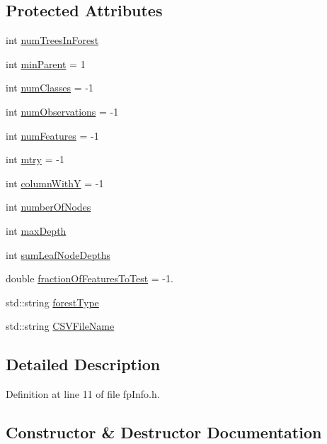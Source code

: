 \subsection*{Protected Attributes}
\begin{DoxyCompactItemize}
\item 
int \hyperlink{classfp_1_1fpInfo_a8dbd62dca5c972c29d29a69d90ca2632}{num\+Trees\+In\+Forest}
\item 
int \hyperlink{classfp_1_1fpInfo_a128fab7ba6da0fc76da00b48bb1bd7d5}{min\+Parent} = 1
\item 
int \hyperlink{classfp_1_1fpInfo_a1c98a9ced12230f21003f78d742625a3}{num\+Classes} = -\/1
\item 
int \hyperlink{classfp_1_1fpInfo_a1b35cd17d4ddb35e232246a6549d7a74}{num\+Observations} = -\/1
\item 
int \hyperlink{classfp_1_1fpInfo_a6ed8deabebae772fc213730cd29a2e61}{num\+Features} = -\/1
\item 
int \hyperlink{classfp_1_1fpInfo_a62cccc1eb5641ebec2a6cc86cf03eedf}{mtry} = -\/1
\item 
int \hyperlink{classfp_1_1fpInfo_ac29e135cd84cdef547b678e7ea37f92d}{column\+WithY} = -\/1
\item 
int \hyperlink{classfp_1_1fpInfo_a9404de3ad49dc78e3d5c8e3ef8b04fba}{number\+Of\+Nodes}
\item 
int \hyperlink{classfp_1_1fpInfo_a95c744fa049788dd61fa0fccdec4565d}{max\+Depth}
\item 
int \hyperlink{classfp_1_1fpInfo_a13afa17097728f059e8525ea382b71cd}{sum\+Leaf\+Node\+Depths}
\item 
double \hyperlink{classfp_1_1fpInfo_ab949cb97523283367e9b120fd78e3c3b}{fraction\+Of\+Features\+To\+Test} = -\/1.
\item 
std\+::string \hyperlink{classfp_1_1fpInfo_a3001fbf80d86022e53578d6adf133b90}{forest\+Type}
\item 
std\+::string \hyperlink{classfp_1_1fpInfo_aac01e5ddb27bc333e172a0422066af1c}{C\+S\+V\+File\+Name}
\end{DoxyCompactItemize}


\subsection{Detailed Description}


Definition at line 11 of file fp\+Info.\+h.



\subsection{Constructor \& Destructor Documentation}
\mbox{\label{classfp_1_1fpInfo_a2a0f7c8215dd138b690efe8a03484aef}} 

